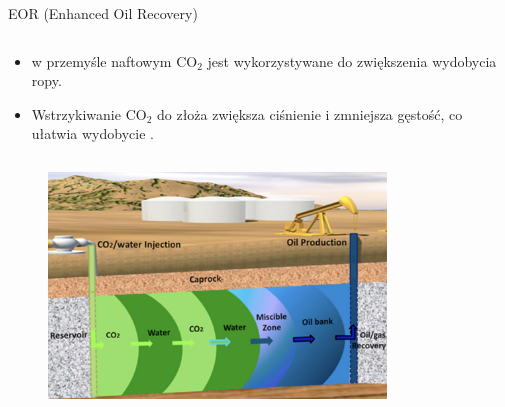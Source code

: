 \begin{columnframe}{EOR (Enhanced Oil Recovery)}
    \begin{column}{0.5\textwidth}
        \begin{itemize}
            \item w przemyśle naftowym CO$_2$ jest wykorzystywane do zwiększenia wydobycia ropy.
            \item Wstrzykiwanie CO$_2$ do złoża zwiększa ciśnienie i zmniejsza gęstość, co ułatwia wydobycie .
        \end{itemize}
    \end{column}
    \begin{column}{0.5\textwidth}
        \begin{figure}
            \centering
            \includegraphics[width=0.8\textwidth, frame]{images/enhanced_oil_recovery.png}
        \end{figure}
    \end{column}
\end{columnframe}

